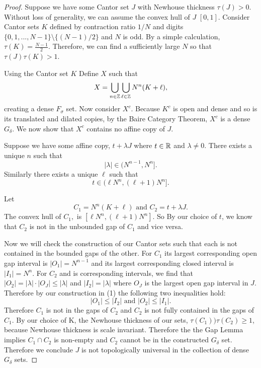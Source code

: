 \begin{proof} Suppose we have some Cantor set $J$ with Newhouse thickness $\tau(J) >0$. Without loss of generality, we  can assume  the convex hull of $J$ $[0,1]$.   Consider Cantor sets $K$ defined by contraction ratio $1/N$ and digits $\{0,1,...,N-1\}\setminus\{(N-1)/2\}$ and $N$ is odd. By a simple calculation,  $\tau (K) = \frac{N-1}{2}$. Therefore,  we can find a  sufficiently large $N$ so that $\tau(J)\tau(K)>1$. 

\medskip

Using the Cantor set $K$ Define $X$ such that 
\begin{equation}\label{cantorCompliment}
    X = \bigcup_{n \in \mathbb{Z}} \bigcup_{\ell \in \mathbb{Z}} N^n(K+\ell),    
\end{equation}
creating a dense $F_\sigma$ set. Now consider $X^c$.  Because $K^c$ is open and dense and so is its translated and dilated copies, by the Baire Category Theorem, $X^c$ is a dense $G_{\delta}$.  We now show that $X^c$ contains no affine copy of $J$. 

\medskip

Suppose we have some affine copy, $t+ \lambda J$ where $t\in\mathbb{R}$ and $\lambda\ne 0$. There exists a unique $n$ such that 
\begin{equation}
    |\lambda| \in (N^{n-1}, N^n].
\end{equation}
Similarly there exists a unique $\ell$ such that 
\begin{equation}
t \in (\ell  N^n, (\ell+1)N^n].    
\end{equation}


Let 
$$C_1 = N^n(K+\ell) \text{ and } C_2 = t+ \lambda J.$$
The convex hull of $C_1,$ is  $[\ell  N^n, (\ell+1)N^n]$.  So By our choice of $t$, we know that $C_2$ is not in the unbounded gap of $C_1$ and vice versa.  

Now we will check the construction of our Cantor sets such that each is not contained in the bounded gaps of the other. For $C_1$ its largest corresponding open gap interval is $|O_1| = N^{n-1}$ and its largest corresponding closed interval is $|I_1| = N^n$. For $C_2$ and is corresponding intervals, we find that $|O_2| =|\lambda|\cdot |O_J| \le |\lambda|$ and $|I_2| = |\lambda|$ where $O_J$ is the largest  open gap interval in $J$.  Therefore by our construction in (1) the following two inequalities hold: $$|O_1|\leq |I_2| \text { and } |O_2| \leq |I_1|.$$ Therefore $C_1$ is not in the gaps of $C_2$ and $C_2$ is not fully contained in the gaps of $C_1$.  By our choice of K, the Newhouse thickness of our sets, $\tau(C_1))\tau(C_2) \geq 1$, because Newhouse thickness is scale invariant.  Therefore the the Gap Lemma implies $C_1 \cap C_2$ is non-empty and $C_2$ cannot be in the constructed $G_{\delta} $ set. Therefore we conclude $J$ is not topologically universal in the collection of dense $G_\delta$ sets.  



\end{proof}
